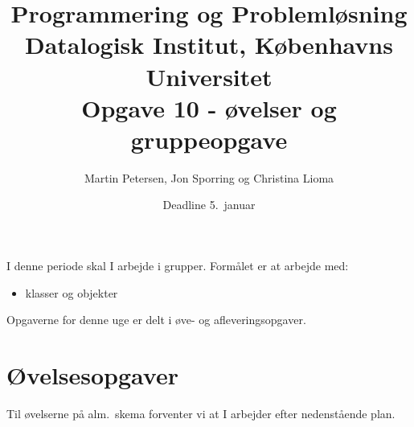 \documentclass[a4paper,12pt]{article}
\title{Programmering og Problemløsning\\Datalogisk Institut,
  Københavns Universitet\\Opgave 10 - øvelser og  gruppeopgave}
\author{Martin Petersen, Jon Sporring og Christina Lioma}
\date{Deadline  5.\ januar}
\begin{document}
\maketitle

I denne periode skal I arbejde i grupper. Formålet er at arbejde med:
\begin{itemize}
\item klasser og objekter
\end{itemize}

Opgaverne for denne uge er delt i øve- og afleveringsopgaver. 

\section*{Øvelsesopgaver}
Til øvelserne på alm.\ skema forventer vi at I arbejder efter nedenstående plan.
\end{document}
